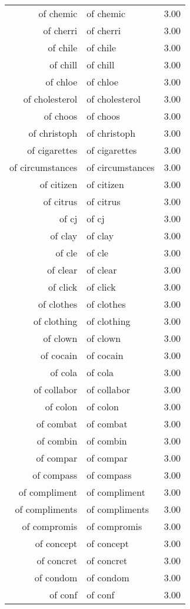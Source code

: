 \begin{table}[ht]
\begin{tabular}{rlr}
  of chemic & of chemic & 3.00 \\ 
  of cherri & of cherri & 3.00 \\ 
  of chile & of chile & 3.00 \\ 
  of chill & of chill & 3.00 \\ 
  of chloe & of chloe & 3.00 \\ 
  of cholesterol & of cholesterol & 3.00 \\ 
  of choos & of choos & 3.00 \\ 
  of christoph & of christoph & 3.00 \\ 
  of cigarettes & of cigarettes & 3.00 \\ 
  of circumstances & of circumstances & 3.00 \\ 
  of citizen & of citizen & 3.00 \\ 
  of citrus & of citrus & 3.00 \\ 
  of cj & of cj & 3.00 \\ 
  of clay & of clay & 3.00 \\ 
  of cle & of cle & 3.00 \\ 
  of clear & of clear & 3.00 \\ 
  of click & of click & 3.00 \\ 
  of clothes & of clothes & 3.00 \\ 
  of clothing & of clothing & 3.00 \\ 
  of clown & of clown & 3.00 \\ 
  of cocain & of cocain & 3.00 \\ 
  of cola & of cola & 3.00 \\ 
  of collabor & of collabor & 3.00 \\ 
  of colon & of colon & 3.00 \\ 
  of combat & of combat & 3.00 \\ 
  of combin & of combin & 3.00 \\ 
  of compar & of compar & 3.00 \\ 
  of compass & of compass & 3.00 \\ 
  of compliment & of compliment & 3.00 \\ 
  of compliments & of compliments & 3.00 \\ 
  of compromis & of compromis & 3.00 \\ 
  of concept & of concept & 3.00 \\ 
  of concret & of concret & 3.00 \\ 
  of condom & of condom & 3.00 \\ 
  of conf & of conf & 3.00 \\ 

\end{tabular}
\end{table}
